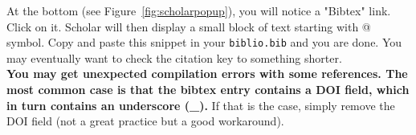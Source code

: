 At the bottom (see Figure~\ref{fig:scholarpopup}), you will notice a "Bibtex" link. Click on it.
Scholar will then display a small block of text starting with @ symbol.
Copy and paste this snippet in your \texttt{biblio.bib} and you are done.
You may eventually want to check the citation key to something shorter.
\\

\textbf{You may get unexpected compilation errors with some references. The most common case is that the bibtex entry contains a DOI field, which in turn contains an underscore (\_).}
If that is the case, simply remove the DOI field (not a great practice but a good workaround).

